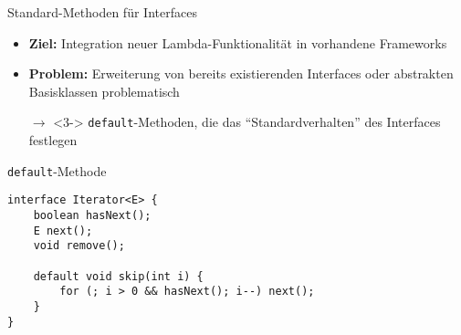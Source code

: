 
\begin{frame}[fragile]{Standard-Methoden für Interfaces}
    \begin{itemize}
        \item<1-> \textbf{Ziel:} Integration neuer Lambda-Funktionalität in vorhandene 
        Frameworks
        \item<2-> \textbf{Problem:} Erweiterung von bereits existierenden Interfaces oder
        abstrakten Basisklassen problematisch
        \item[$\rightarrow$]<3-> \texttt{default}-Methoden, die das \enquote{Standardverhalten}
        des Interfaces festlegen  
    \end{itemize}

    \pause\pause

    \begin{center}
        \begin{minipage}[b]{0.75\textwidth}
            \begin{block}{\texttt{default}-Methode \citep{goetz13}}
                \begin{lstlisting}  
interface Iterator<E> {
    boolean hasNext();
    E next();
    void remove();

    default void skip(int i) {
        for (; i > 0 && hasNext(); i--) next();
    }
}
                \end{lstlisting}
            \end{block}
        \end{minipage}
    \end{center}
\end{frame}

